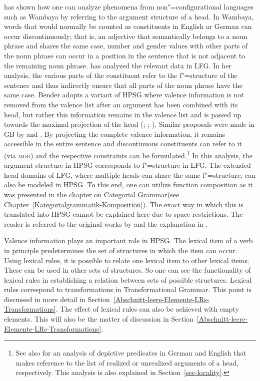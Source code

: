 \citet{Bender2008a}\label{Seite-Bender-Wambaya} has shown how one can analyze phenomena from non"=configurational languages such as Wambaya
by referring to the argument structure of a head. In Wambaya, words that would normally be counted as constituents in English or German can occur discontinuously; that
is, an adjective that semantically belongs to a noun phrase and shares the same case, number and gender values with other parts of the noun
phrase can occur in a position in the sentence that is not adjacent to the remaining noun phrase. \citet{Nordlinger98a-u} has analyzed the relevant data in LFG\indexlfg. In her analysis, the various parts
of the constituent refer to the f"=structure of the sentence and thus indirectly ensure that all parts of the noun phrase have the same case.
Bender adopts a variant of HPSG where valence information is not removed from the valence list after an argument has been combined with its head, but rather
this information remains in the valence list and is passed up towards the maximal projection of the head (\citealp{Meurers99b}; \citealp{Prze99};
\citealp[Section~17.4]{MuellerLehrbuch1}). Similar proposals were made in GB by \citet[]{Higginbotham85a} and \citet{Winkler97a}. 
By projecting the complete valence information, it remains accessible in the entire sentence and discontinuous constituents can refer to it (\eg via \textsc{mod})
and the respective constraints can be formulated.\footnote{%
	See also  for an analysis of depictive predicates in German and English that makes reference to the list of
	realized or unrealized arguments of a head, respectively. This analysis is also explained in Section~\ref{sec-locality}.
}  
In this analysis, the argument structure in HPSG corresponds to f"=structure in LFG. The extended head domains of LFG\indexlfg, where
multiple heads can share the same f"=structure, can also be modeled in HPSG. To this end, one can utilize function composition
as it was presented in the chapter on Categorial Grammar\indexcg (see Chapter~\ref{Kategorialgrammatik-Komposition}). The exact way in which this is
translated into HPSG cannot be explained here due to space restrictions. The reader is referred to the original works by \citet{HN94a} and the
explanation in .
	
Valence information plays an important role in HPSG. The lexical item of a verb in principle
predetermines the set of structures in which the item can occur.
Using lexical rules, it is possible to relate one lexical item to other lexical items. These can be
used in other sets of structures. So one can see the functionality of lexical rules in establishing
a relation between sets of possible structures. Lexical rules correspond to transformations in Transformational Grammar. This point is discussed in more detail in 
Section~\ref{Abschnitt-leere-Elemente-LRs-Transformations}. The effect of lexical rules can also be achieved with empty elements. This will also be
the matter of discussion in Section~\ref{Abschnitt-leere-Elemente-LRs-Transformations}.

